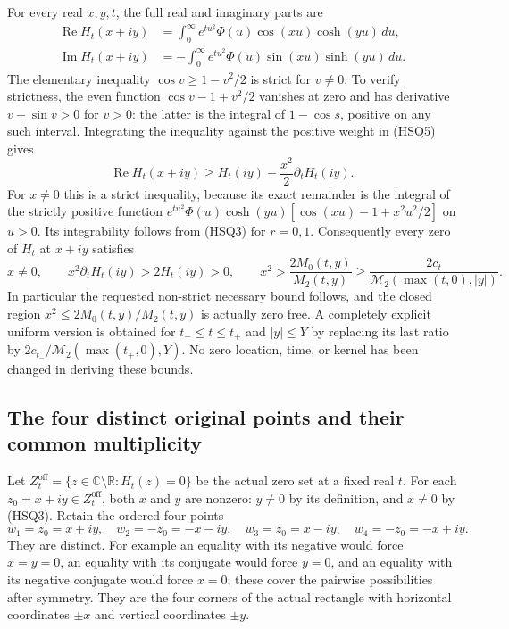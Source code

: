 For every real $x,y,t$, the full real and imaginary parts are
\begin{equation}\tag{HSQ5}
 \begin{split}
 \operatorname{Re}H_t(x+iy)
   &=\int_0^\infty e^{tu^2}\Phi(u)\cos(xu)\cosh(yu)\,du,\\
 \operatorname{Im}H_t(x+iy)
   &=-\int_0^\infty e^{tu^2}\Phi(u)\sin(xu)\sinh(yu)\,du.
 \end{split}
\end{equation}
The elementary inequality $\cos v\ge1-v^2/2$ is strict for
$v\ne0$. To verify strictness, the even function
$\cos v-1+v^2/2$ vanishes at zero and has derivative
$v-\sin v>0$ for $v>0$: the latter is the integral of
$1-\cos s$, positive on any such interval. Integrating the
inequality against the positive weight in (HSQ5) gives
\begin{equation}\tag{HSQ6}
 \operatorname{Re}H_t(x+iy)
   \ge H_t(iy)-\frac{x^2}{2}\partial_tH_t(iy).
\end{equation}
For $x\ne0$ this is a strict inequality, because its exact
remainder is the integral of the strictly positive function
$e^{tu^2}\Phi(u)\cosh(yu)
 [\cos(xu)-1+x^2u^2/2]$ on $u>0$. Its integrability follows
from (HSQ3) for $r=0,1$.
Consequently every zero of $H_t$ at $x+iy$ satisfies
\begin{equation}\tag{HSQ7}
 x\ne0,\qquad
 x^2\partial_tH_t(iy)>2H_t(iy)>0,
 \qquad
 x^2>\frac{2M_0(t,y)}{M_2(t,y)}
       \ge\frac{2c_t}{\mathcal M_2(\max(t,0),|y|)}.
\end{equation}
In particular the requested non-strict necessary bound follows,
and the closed region $x^2\le2M_0(t,y)/M_2(t,y)$ is actually
zero free. A completely explicit uniform version is obtained for
$t_-\le t\le t_+$ and $|y|\le Y$ by replacing its last ratio
by $2c_{t_-}/\mathcal M_2(\max(t_+,0),Y)$. No zero location,
time, or kernel has been changed in deriving these bounds.

\subsection{The four distinct original points and their common multiplicity}

Let $Z_t^{\mathrm{off}}=\{z\in\mathbb C\setminus\mathbb R:
H_t(z)=0\}$ be the actual zero set at a fixed real $t$.
For each $z_0=x+iy\in Z_t^{\mathrm{off}}$, both $x$ and $y$
are nonzero: $y\ne0$ by its definition, and $x\ne0$ by
(HSQ3). Retain the ordered four points
\begin{equation}\tag{HSQ8}
 w_1=z_0=x+iy,\quad w_2=-z_0=-x-iy,\quad
 w_3=\overline{z_0}=x-iy,\quad
 w_4=-\overline{z_0}=-x+iy.
\end{equation}
They are distinct. For example an equality with its negative
would force $x=y=0$, an equality with its conjugate would force
$y=0$, and an equality with its negative conjugate would force
$x=0$; these cover the pairwise possibilities after symmetry.
They are the four corners of the actual rectangle with horizontal
coordinates $\pm x$ and vertical coordinates $\pm y$.

